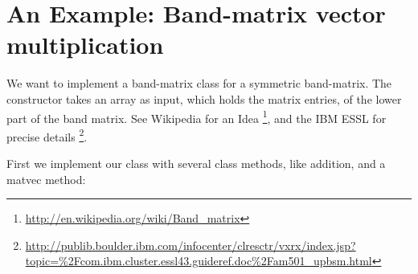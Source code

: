 \documentclass[letterpaper,10pt,english]{manual}
\begin{document}
\chapter{An Example: Band-matrix vector multiplication}

We want to implement a band-matrix class for a symmetric band-matrix.
The constructor  takes an array as input, which holds the matrix
entries, of the lower part of the band matrix. See Wikipedia for
an Idea \footnote{
\href{http://en.wikipedia.org/wiki/Band\_matrix}{http://en.wikipedia.org/wiki/Band\_matrix}
}, and the IBM ESSL for precise details \footnote{
\href{http://publib.boulder.ibm.com/infocenter/clresctr/vxrx/index.jsp?topic=\%2Fcom.ibm.cluster.essl43.guideref.doc\%2Fam501\_upbsm.html}{http://publib.boulder.ibm.com/infocenter/clresctr/vxrx/index.jsp?topic=\%2Fcom.ibm.cluster.essl43.guideref.doc\%2Fam501\_upbsm.html}
}.

First we implement our class with several class methods, like
addition, and a matvec method:
\end{document}

